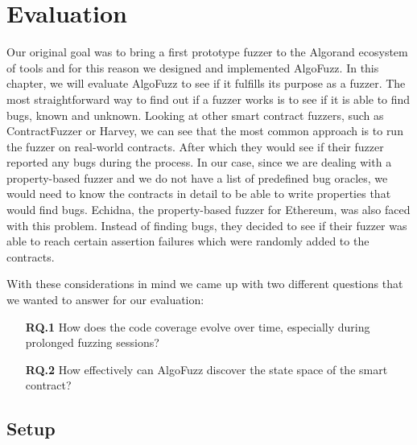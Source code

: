 
\chapter{Evaluation}\label{chapter:evaluation}
Our original goal was to bring a first prototype fuzzer to the Algorand ecosystem of tools and for this reason we designed and implemented AlgoFuzz.
In this chapter, we will evaluate AlgoFuzz to see if it fulfills its purpose as a fuzzer.
The most straightforward way to find out if a fuzzer works is to see if it is able to find bugs, known and unknown.
Looking at other smart contract fuzzers, such as ContractFuzzer or Harvey, we can see that the most common approach is to run the fuzzer on real-world contracts.
After which they would see if their fuzzer reported any bugs during the process.
In our case, since we are dealing with a property-based fuzzer and we do not have a list of predefined bug oracles, we would need to know the contracts in detail to be able to write properties that would find bugs.
Echidna, the property-based fuzzer for Ethereum, was also faced with this problem.
Instead of finding bugs, they decided to see if their fuzzer was able to reach certain assertion failures which were randomly added to the contracts.

With these considerations in mind we came up with two different questions that we wanted to answer for our evaluation:
\begin{enumerate}
    \item[\textbf{RQ.1}] How does the code coverage evolve over time, especially during prolonged fuzzing sessions?

    \item[\textbf{RQ.2}] How effectively can AlgoFuzz discover the state space of the smart contract?
\end{enumerate}

\section{Setup}

